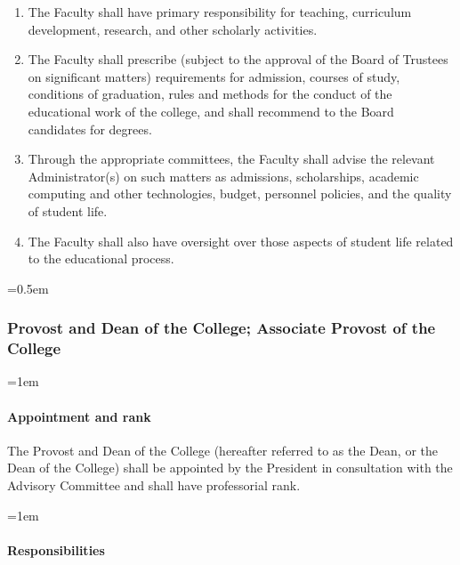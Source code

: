 \documentclass{manual}
\let\oldsubsubsection\subsubsection
\renewcommand\subsubsection{\leftskip=0.5em\oldsubsubsection}
\let\oldparagraph\paragraph
\renewcommand\paragraph{\leftskip=1em\oldparagraph}
\newcommand{\itemLevelA}{\alph*.}
\newcommand{\itemRefA}{\alph*}
\begin{document}
	\begin{enumerate}[label=\itemLevelA,ref=\itemRefA]
	\item The Faculty shall have primary responsibility for teaching, curriculum development, research, and other scholarly activities.
	\item The Faculty shall prescribe (subject to the approval of the Board of Trustees on significant matters) requirements for admission, courses of study, conditions of graduation, rules and methods for the conduct of the educational work of the college, and shall recommend to the Board candidates for degrees.
	\item Through the appropriate committees, the Faculty shall advise the relevant Administrator(s) on such matters as admissions, scholarships, academic computing and other technologies, budget, personnel policies, and the quality of student life.
	\item The Faculty shall also have oversight over those aspects of student life related to the educational process. 
	\end{enumerate}

\subsubsection{Provost and Dean of the College; Associate Provost of the College}

\paragraph{Appointment and rank}
The Provost and Dean of the College (hereafter referred to as the Dean, or the Dean of the College) shall be appointed by the President in consultation with the Advisory Committee and shall have professorial rank.

\paragraph{Responsibilities}
\end{document}
